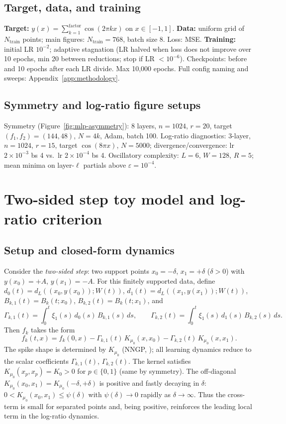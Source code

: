 \documentclass{article}
\theoremstyle{plain}
\theoremstyle{definition}
\begin{document}
\subsection{Target, data, and training}
\textbf{Target:} $y(x) = \sum_{k=1}^{\mathrm{factor}} \cos(2\pi k x)$ on $x \in [-1,1]$. \textbf{Data:} uniform grid of $N_{\mathrm{train}}$ points; main figures: $N_{\mathrm{train}}=768$, batch size $8$. Loss: MSE. \textbf{Training:} initial LR $10^{-2}$; adaptive stagnation (LR halved when loss does not improve over 10 epochs, min 20 between reductions; stop if LR $< 10^{-6}$). Checkpoints: before and 10 epochs after each LR divide. Max 10,000 epochs. Full config naming and sweeps: Appendix~\ref{app:methodology}.

\subsection{Symmetry and log-ratio figure setups}
Symmetry (Figure~\ref{fig:mlp-asymmetry}): 8 layers, $n=1024$, $r=20$, target $(f_1,f_2)=(144,48)$, $N=4k$, Adam, batch 100. Log-ratio diagnostics: 3-layer, $n=1024$, $r=15$, target $\cos(8\pi x)$, $N=5000$; divergence/convergence: lr $2{\times}10^{-3}$ bs 4 vs.\ lr $2{\times}10^{-4}$ bs 4. Oscillatory complexity: $L=6$, $W=128$, $R=5$; mean minima on layer-$\ell$ partials above $\varepsilon=10^{-4}$.

\section{Two-sided step toy model and log-ratio criterion}
\label{app:toy}

\subsection{Setup and closed-form dynamics}

Consider the \emph{two-sided step}: two support points $x_0=-\delta$, $x_1=+\delta$ ($\delta>0$) with $y(x_0)=+A$, $y(x_1)=-A$. For this finitely supported data, define $d_0(t)=d_L((x_0,y(x_0));W(t))$, $d_1(t)=d_L((x_1,y(x_1));W(t))$, $B_{k,1}(t)=B_k(t;x_0)$, $B_{k,2}(t)=B_k(t;x_1)$, and
\[
\Gamma_{k,1}(t) = \int_0^t \xi_1(s)\,d_0(s)\,B_{k,1}(s)\,ds,\qquad \Gamma_{k,2}(t) = \int_0^t \xi_1(s)\,d_1(s)\,B_{k,2}(s)\,ds.
\]
Then $f_k$ takes the form
\begin{equation}
\label{eq:fk-twostep}
f_k(t,x) = f_k(0,x) - \Gamma_{k,1}(t)\,K_{\mu_0}(x,x_0) - \Gamma_{k,2}(t)\,K_{\mu_0}(x,x_1).
\end{equation}
The spike shape is determined by $K_{\mu_0}$ (NNGP, \cite{jacot2018neural}); all learning dynamics reduce to the scalar coefficients $\Gamma_{k,1}(t)$, $\Gamma_{k,2}(t)$. The kernel satisfies $K_{\mu_0}(x_p,x_p)=K_0>0$ for $p\in\{0,1\}$ (same by symmetry). The off-diagonal $K_{\mu_0}(x_0,x_1)=K_{\mu_0}(-\delta,+\delta)$ is positive and fastly decaying in $\delta$: $0<K_{\mu_0}(x_0,x_1)\le \psi(\delta)$ with $\psi(\delta)\to 0$ rapidly as $\delta\to\infty$. Thus the cross-term is small for separated points and, being positive, reinforces the leading local term in the log-ratio dynamics.
\end{document}
